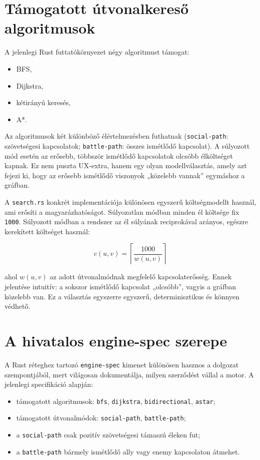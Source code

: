 ﻿\documentclass[a4paper,12pt]{report}
\begin{document}
\section{Támogatott útvonalkereső algoritmusok}

A jelenlegi Rust futtatókörnyezet négy algoritmust támogat:

\begin{itemize}
    \item BFS,
    \item Dijkstra,
    \item kétirányú keresés,
    \item A*.
\end{itemize}

Az algoritmusok két különböző élértelmezésben futhatnak (\texttt{social-path}: szövetségesi kapcsolatok; \texttt{battle-path}: összes ismétlődő kapcsolat). A súlyozott mód esetén az erősebb, többször ismétlődő kapcsolatok olcsóbb élköltséget kapnak. Ez nem puszta UX-extra, hanem egy olyan modellválasztás, amely azt fejezi ki, hogy az erősebb ismétlődő viszonyok „közelebb vannak” egymáshoz a gráfban.

A \texttt{search.rs} konkrét implementációja különösen egyszerű költségmodellt használ, ami erősíti a magyarázhatóságot. Súlyozatlan módban minden él költsége fix \texttt{1000}. Súlyozott módban a rendszer az él súlyának reciprokával arányos, egészre kerekített költséget használ:

\begin{equation}
c(u,v)=\left\lceil \frac{1000}{w(u,v)} \right\rceil
\end{equation}

ahol $w(u,v)$ az adott útvonalmódnak megfelelő kapcsolaterősség. Ennek jelentése intuitív: a sokszor ismétlődő kapcsolat „olcsóbb”, vagyis a gráfban közelebb van. Ez a választás egyszerre egyszerű, determinisztikus és könnyen védhető.

\section{A hivatalos engine-spec szerepe}

A Rust réteghez tartozó \texttt{engine-spec} kimenet különösen hasznos a dolgozat szempontjából, mert világosan dokumentálja, milyen szerződést vállal a motor. A jelenlegi specifikáció alapján:

\begin{itemize}
    \item támogatott algoritmusok: \texttt{bfs}, \texttt{dijkstra}, \texttt{bidirectional}, \texttt{astar};
    \item támogatott útvonalmódok: \texttt{social-path}, \texttt{battle-path};
    \item a \texttt{social-path} csak pozitív szövetségesi támaszú éleken fut;
    \item a \texttt{battle-path} bármely ismétlődő ally vagy enemy kapcsolaton átmehet.
\end{itemize}
\end{document}
